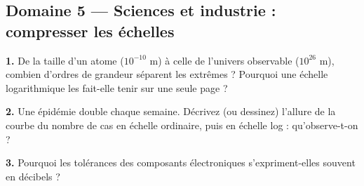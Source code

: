 \documentclass[11pt,a4paper]{article}
\begin{document}
\subsection*{Domaine 5 --- Sciences et industrie : compresser les échelles}
\textbf{1.} De la taille d'un atome ($10^{-10}$ m) à celle de l'univers observable ($10^{26}$ m), combien d'ordres de grandeur séparent les extrêmes ? Pourquoi une échelle logarithmique les fait-elle tenir sur une seule page ?
\par\smallskip
\noindent\makebox[\linewidth]{\dotfill}\par\vspace{1em}
\noindent\makebox[\linewidth]{\dotfill}\par\vspace{1em}
\noindent\makebox[\linewidth]{\dotfill}\par\vspace{1em}
\par\medskip
\textbf{2.} Une épidémie double chaque semaine. Décrivez (ou dessinez) l'allure de la courbe du nombre de cas en échelle ordinaire, puis en échelle log : qu'observe-t-on ?
\par\smallskip
\noindent\makebox[\linewidth]{\dotfill}\par\vspace{1em}
\noindent\makebox[\linewidth]{\dotfill}\par\vspace{1em}
\noindent\makebox[\linewidth]{\dotfill}\par\vspace{1em}
\par\medskip
\textbf{3.} Pourquoi les tolérances des composants électroniques s'expriment-elles souvent en décibels ?
\par\smallskip
\noindent\makebox[\linewidth]{\dotfill}\par\vspace{1em}
\noindent\makebox[\linewidth]{\dotfill}\par\vspace{1em}
\noindent\makebox[\linewidth]{\dotfill}\par\vspace{1em}
\par\medskip
\end{document}
